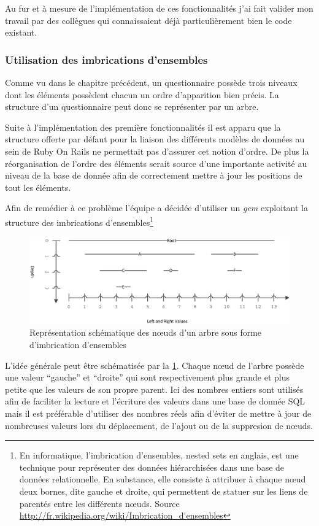 \documentclass[12pt,a4paper]{book}
\begin{document}
Au fur et à mesure de l'implémentation de ces fonctionnalités j'ai fait valider mon travail par des collègues qui connaissaient déjà particulièrement bien le code existant.

\subsubsection{Utilisation des imbrications d'ensembles}
\label{section.ans}

Comme vu dans le chapitre précédent, un questionnaire possède trois niveaux dont les éléments possèdent chacun un ordre d'apparition bien précis. La structure d'un questionnaire peut donc se représenter par un arbre.

Suite à l'implémentation des première fonctionnalités il est apparu que la structure offerte par défaut pour la liaison des différents modèles de données au sein de Ruby On Rails ne permettait pas d'assurer cet notion d'ordre. De plus la réorganisation de l'ordre des éléments serait source d'une importante activité au niveau de la base de donnée afin de correctement mettre à jour les positions de tout les éléments.

Afin de remédier à ce problème l'équipe a décidée d'utiliser un \textit{gem} exploitant la structure des imbrications d'ensembles\footnote{En informatique, l'imbrication d'ensembles, nested sets en anglais, est une technique pour représenter des données hiérarchisées dans une base de données relationnelle. En substance, elle consiste à attribuer à chaque nœud deux bornes, dite gauche et droite, qui permettent de statuer sur les liens de parentés entre les différents nœuds. Source \url{http://fr.wikipedia.org/wiki/Imbrication_d'ensembles}}

\begin{figure}[htp]
\centering
\includegraphics[scale=.12]{img/nested1.png}
\caption{Représentation schématique des nœuds d'un arbre sous forme d'imbrication d'ensembles}
\label{img:nested1}
\end{figure}

L'idée générale peut être schématisée par la \cref{img:nested1}. Chaque nœud de l'arbre possède une valeur ``gauche'' et ``droite'' qui sont respectivement plus grande et plus petite que les valeurs de son propre parent. Ici des nombres entiers sont utilisés afin de faciliter la lecture et l'écriture des valeurs dans une base de donnée SQL mais il est préférable d'utiliser des nombres réels afin d'éviter de mettre à jour de nombreuses valeurs lors du déplacement, de l'ajout ou de la suppresion de nœuds.
\end{document}
